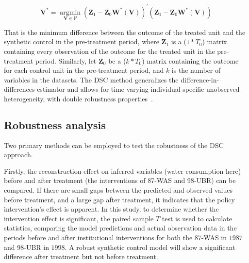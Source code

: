 \begin{equation}
    \mathbf{V}^{*}=\underset{\mathbf{V} \in \mathcal{V}}{\operatorname{argmin}}\left(\mathbf{Z}_{1}-\mathbf{Z}_{0} \mathbf{W}^{*}(\mathbf{V})\right)^{\prime}\left(\mathbf{Z}_{1}-\mathbf{Z}_{0} \mathbf{W}^{*}(\mathbf{V})\right)
\end{equation}

That is the minimum difference between the outcome of the treated unit and the synthetic control in the pre-treatment period, where $\mathbf{Z}_{1}$ is a ($1*T_0$) matrix containing every observation of the outcome for the treated unit in the pre-treatment period. Similarly, let $\mathbf{Z}_{0}$ be a ($k * T_0$) matrix containing the outcome for each control unit in the pre-treatment period, and $k$ is the number of variables in the datasets.
The DSC method generalizes the difference-in-differences estimator and allows for time-varying individual-specific unobserved heterogeneity, with double robustness properties~\cite{billmeier2013, smith2015}.

\subsection{Robustness analysis}\label{sec:robustness}

Two primary methods can be employed to test the robustness of the DSC approach.

Firstly, the reconstruction effect on inferred variables (water consumption here) before and after treatment (the interventions of 87-WAS and 98-UBR) can be compared.
If there are small gaps between the predicted and observed values before treatment, and a large gap after treatment, it indicates that the policy intervention's effect is apparent.
In this study, to determine whether the intervention effect is significant, the paired sample $T$ test is used to calculate statistics, comparing the model predictions and actual observation data in the periods before and after institutional interventions for both the 87-WAS in $1987$ and 98-UBR in $1998$.
A robust synthetic control model will show a significant difference after treatment but not before treatment.

